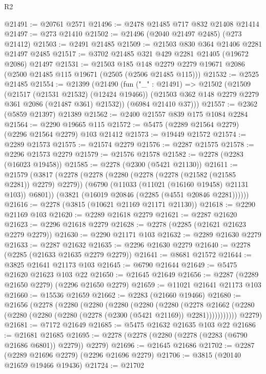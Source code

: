 \begin{lexlean}{R2}
\begin{coremodule}
@21491 := @20761 @2571
@21496 := @2478 @21485 @717 @832 @21408 @21414
@21497 := @273 @21410
@21502 := @21496 (@2040 @21497 @2485) (@273 @21412)
@21503 := @2491 @21485
@21509 := @21503 @830 @364 @21406 @2281 @21497 @2485
@21517 := @3702 @21485 @321 @429 @2281 @21405 (@19672 @2086) @21497
@21531 := @21503
    @185
    @148
    @2279
    @2279
    @19671
    @2086
    (@2500 @21485 @115 @19671 (@2505 (@2506 @21485 @115)))
@21532 := @2525 @21485
@21554 := @21399
    (@21490
      (fun ("_" : @21491) =>
      @21502
        (@21509
          (@21517 (@21531 @21532) (@12424 @19466))
          (@21503 @362 @148 @2279 @2279 @361 @2086 (@21487 @361) @21532))
        (@6984 @21410 @37)))
@21557 := @2362 (@5859 @21397) @21389
@21562 := @2400 @21557 @839 @175 @1084 @2284
@21564 := @2290 @19665 @115
@21572 := @5475 (@2289 @21564 @2279) (@2296 @21564 @2279) @103 @21412
@21573 := @19449 @21572
@21574 := @2289 @21573
@21575 := @21574 @2279
@21576 := @2287 @21575
@21578 := @2296 @21573 @2279
@21579 := @21576 @21578
@21582 := @2278 (@2283 (@16023 @19458))
@21585 := @2278 (@2300 (@5421 @21130))
@21611 := @21579
    (@3817
      (@2278
        (@2278
          (@2280 (@2278 (@2278 (@21582 (@21585 @2281)) @2279) @2279))
          (@6790 (@11033 (@11021 (@16160 @19458) @21131 @103)) @6801))
        (@3821 (@16019 @20846 (@2285 (@4551 @20846 @2281))))))
@21616 := @2278 (@3815 (@10621 @21169 @21171 @21130))
@21618 := @2290 @21169 @103
@21620 := @2289 @21618 @2279
@21621 := @2287 @21620
@21623 := @2296 @21618 @2279
@21628 := @2278 (@2285 (@21621 @21623 @2279 @2279))
@21630 := @2290 @21171 @103
@21632 := @2289 @21630 @2279
@21633 := @2287 @21632
@21635 := @2296 @21630 @2279
@21640 := @2278 (@2285 (@21633 @21635 @2279 @2279))
@21641 := @8681 @21572
@21644 := @3825 @21641 @21173 @103
@21645 := @6790 @21644
@21649 := @5475 @21620 @21623 @103 @22
@21650 := @21645 @21649
@21656 := @2287 (@2289 @21650 @2279) (@2296 @21650 @2279)
@21659 := @11021 @21641 @21173 @103
@21660 := @15536 @21659
@21662 := @2283 (@21660 @19466)
@21680 := @21656
    (@2278
      (@2280
        (@2280
          (@2280
            (@2280
              (@2280
                (@2278
                  @21662
                  (@2280 (@2280 (@2280 (@2280 (@2278 (@2300 (@5421 @21169)) @2281)))))))))))
      @2279)
@21681 := @7172 @21649
@21685 := @5475 @21632 @21635 @103 @22
@21686 := @21681 @21685
@21695 := @2278 (@2278 (@2280 (@2278 (@2283 (@6790 @21686 @6801)) @2279)) @2279)
@21696 := @21645 @21686
@21702 := @2287 (@2289 @21696 @2279) (@2296 @21696 @2279)
@21706 := @3815 (@20140 @21659 @19466 @19436)
@21724 := @21702

\end{coremodule}
\end{lexlean}
